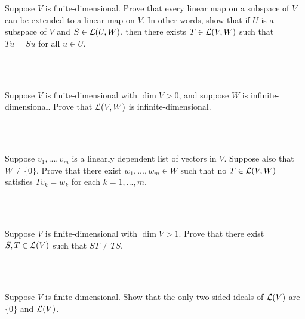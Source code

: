 \begin{solution}
    \\ \td \\
\end{solution}

\begin{exercise}
    Suppose $V$ is finite-dimensional. Prove that every linear map on a subspace of $V$ can be extended to a linear map on $V$. In other words, show that if $U$ is a subspace of $V$ and $S \in \mathcal{L}(U,W)$, then there exists $T \in \mathcal{L}(V,W)$ such that $Tu = Su$ for all $u \in U$. \\
\end{exercise}

\begin{solution}
    \\ \td \\
\end{solution}

\begin{exercise}
    Suppose $V$ is finite-dimensional with $\dim V > 0$, and suppose $W$ is infinite-dimensional. Prove that $\mathcal{L}(V,W)$ is infinite-dimensional. \\
\end{exercise}

\begin{solution}
    \\ \td \\
\end{solution}

\begin{exercise}
    Suppose $v_1, ..., v_m$ is a linearly dependent list of vectors in $V$. Suppose also that $W \neq \{0\}$. Prove that there exist $w_1, ..., w_m \in W$ such that no $T \in \mathcal{L}(V,W)$ satisfies $Tv_k = w_k$ for each $k = 1, ..., m$. \\
\end{exercise}

\begin{solution}
    \\ \td \\
\end{solution}

\begin{exercise}
    Suppose $V$ is finite-dimensional with $\dim V > 1$. Prove that there exist $S,T \in \mathcal{L}(V)$ such that $ST \neq TS$. \\
\end{exercise}

\begin{solution}
    \\ \td \\
\end{solution}

\begin{exercise}
    Suppose $V$ is finite-dimensional. Show that the only two-sided ideals of $\mathcal{L}(V)$ are $\{0\}$ and $\mathcal{L}(V)$. \\
\end{exercise}

\begin{solution}
    \\ \td \\
\end{solution}
